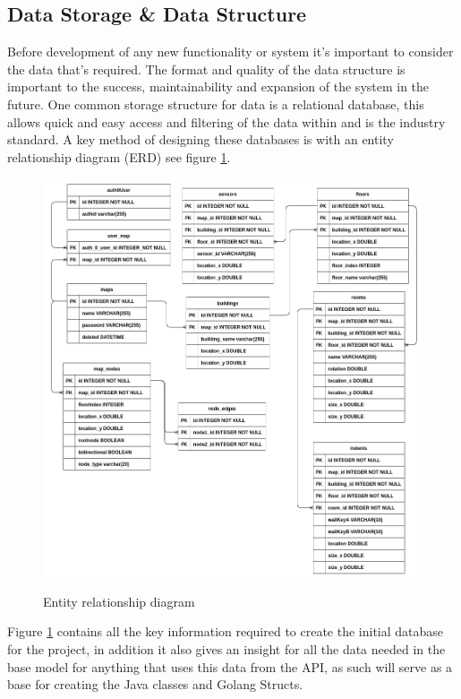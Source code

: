 \subsection{Data Storage \& Data Structure}
Before development of any new functionality or system it's important to consider the data that's required. The format and quality of the data structure is important to the success, maintainability and expansion of the system in the future. One common storage structure for data is a relational database, this allows quick and easy access and filtering of the data within and is the industry standard. A key method of designing these databases is with an entity relationship diagram (ERD) see figure \ref{fig:erd}.

\begin{figure}[h]
	\centering
	\includegraphics[width=.9\linewidth]{./images/designs/erddetailed.png}\\
	\caption{Entity relationship diagram}
	\label{fig:erd}
\end{figure}

Figure \ref{fig:erd} contains all the key information required to create the initial database for the project, in addition it also gives an insight for all the data needed in the base model for anything that uses this data from the API, as such will serve as a base for creating the Java classes and Golang Structs. 

